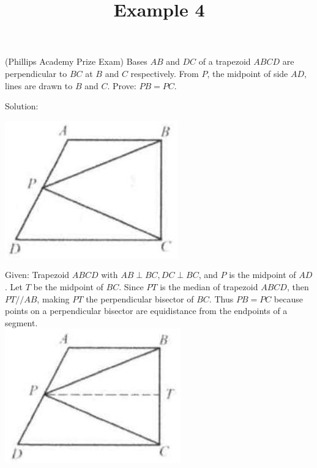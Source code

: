 \documentclass{article}
\title{Example 4}
\date{}
\begin{document}
\maketitle

(Phillips Academy Prize Exam) Bases \(A B\) and \(D C\) of a trapezoid \(A B C D\) are perpendicular to \(B C\) at \(B\) and \(C\) respectively. From \(P\), the midpoint of side \(A D\), lines are drawn to \(B\) and \(C\). Prove: \(P B=P C\).

Solution:
\begin{center}
\includegraphics[width=\textwidth]{images/problem_image_1.jpg}
\end{center}

Given: Trapezoid \(A B C D\) with \(A B \perp B C, D C \perp B C\), and \(P\) is the midpoint of \(A D\). Let \(T\) be the midpoint of \(B C\). Since \(P T\) is the median of trapezoid \(A B C D\), then \(P T / / A B\), making \(P T\) the perpendicular bisector of \(B C\). Thus \(P B=P C\) because points on a perpendicular bisector are equidistance from the endpoints of a segment.\\
\centering
\includegraphics[width=\textwidth]{images/reasoning_image_1.jpg}
\end{document}
